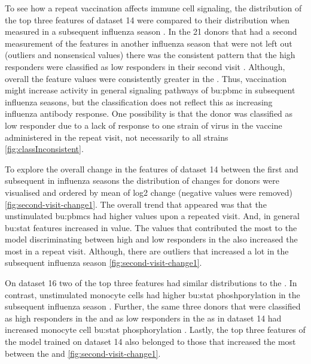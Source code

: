 To see how a repeat vaccination affects immune cell signaling, the distribution of the top three features of dataset 14 were compared to their distribution when measured in a subsequent influenza season .
In the 21 donors that had a second measurement of the features in another influenza season that were not left out (outliers and nonsensical values) there was the consistent pattern that the high responders were classified as low responders in their second visit .
Although, overall the feature values were consistently greater in the \secondvis {}.
Thus, vaccination might increase activity in general signaling pathways of \gls{bu:pbmc} in subsequent influenza seasons, but the classification does not reflect this as increasing influenza antibody response.
One possibility is that the donor was classified as low responder due to a lack of response to one strain of virus in the vaccine administered in the repeat visit, not necessarily to all strains \autoref{fig:classInconsistent}.

To explore the overall change in the features of dataset 14 between the first and subsequent in influenza seasons the distribution of changes for donors were visualised and ordered by mean of log2 change (negative values were removed) \autoref{fig:second-visit-change1}.
The overall trend that appeared was that the unstimulated \gls{bu:pbmc}s had higher values upon a repeated visit.
And, in general \gls{bu:stat} features increased in value. The values that contributed the most to the model discriminating between high and low responders in the \firstvis also increased the most in a repeat visit.
Although, there are outliers that increased a lot in the subsequent influenza season \autoref{fig:second-visit-change1}.

On dataset 16 two of the top three features had similar distributions to the \firstvis {}.
In contrast, unstimulated monocyte cells had higher \gls{bu:stat} phoshporylation in the subsequent influenza season .
Further, the same three donors that were classified as high responders in the \firstvis and as low responders in the \secondvis as in dataset 14  had increased monocyte cell \gls{bu:stat} phosphorylation .
Lastly, the top three features of the model trained on dataset 14 also belonged to those that increased the most between the \firstvis and \secondvis \autoref{fig:second-visit-change1}.

